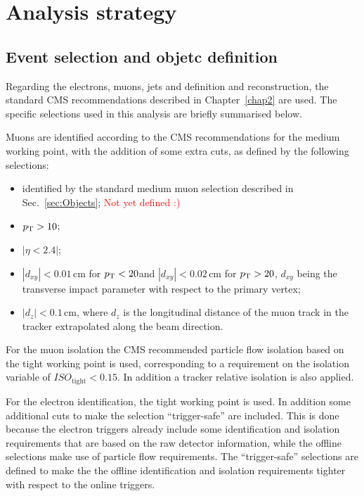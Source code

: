 \section{Analysis strategy}\label{chap5:analysis_strategy}

\subsection{Event selection and objetc definition}

Regarding the electrons, muons, jets and \MET definition and reconstruction, the standard CMS recommendations described in Chapter~\ref{chap2} are used. The specific selections used in this analysis are briefly summarised below.

Muons are identified according to the CMS recommendations for the medium working point, with the addition of some extra cuts, as defined by the following selections:
\begin{itemize}
\item identified by the standard medium muon selection described in Sec.~\ref{sec:Objects}; \textcolor{red}{Not yet defined :)}
\item $p_\mathrm{T}> 10$\GeV;
\item $|\eta < 2.4|$;
\item $|d_{xy}| < 0.01$\,cm for $p_\mathrm{T} < 20$\GeV and $|d_{xy}| < 0.02$\,cm for $p_\mathrm{T} > 20$\GeV, $d_{xy}$ being the transverse impact parameter with respect to the primary vertex;
\item $|d_{z}| < 0.1$\,cm, where $d_z$ is the longitudinal distance of the muon track in the tracker extrapolated along the beam direction.
\end{itemize}

For the muon isolation the CMS recommended particle flow isolation based on the tight working point is used, corresponding to a requirement on the isolation variable of $ISO_\mathrm{tight} < 0.15$. In addition a tracker relative isolation is also applied.

For the electron identification, the tight working point is used. In addition some additional cuts to make the selection ``trigger-safe'' are included. This is done because the electron triggers already include some identification and isolation requirements that are based on the raw detector information, while the offline selections make use of particle flow requirements. The ``trigger-safe'' selections are defined to make the the offline identification and isolation requirements tighter with respect to the online triggers.

